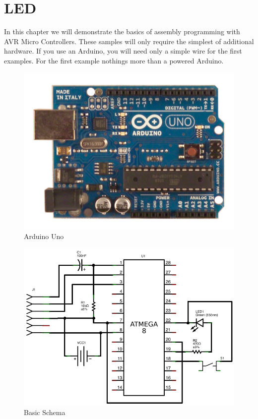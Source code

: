 \documentclass[twoside,english,12pt,authoryear,openright]{book}
\begin{document}
\chapter{LED}

In this chapter we will demonstrate the basics of assembly programming with AVR Micro Controllers. These samples will only require the simplest of additional hardware. If you use an Arduino, you will need only a simple wire for the first examples. For the first example nothings more than a powered Arduino.

\begin{figure}[htbp]
  \centering
  \includegraphics[width=120mm]{Media/www-arduino-cc_ArduinoUnoFront.jpeg}
  \caption{Arduino Uno}
  \label{ArduinoUnoFront}
\end{figure}



\begin{figure}[htbp]
  \centering
  \includegraphics[width=120mm]{LED/S000_LED-Basic-Circuit_schema.png}
  \caption{Basic Schema}
  \label{atmega8-basic-schema}
\end{figure}
\end{document}
